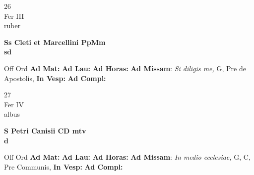 \documentclass[10pt, openany]{book}
\begin{document}
        \begin{center}
            \begin{minipage}{3.5in}
                \vspace{2em}
                \begin{minipage}{0.5in}
                    {\Huge 26} \\
                    {\normalsize Fer III} \\
                    {\normalsize ruber}
                \end{minipage}
                \begin{minipage}{3.0in}
                    \textbf{ \large Ss Cleti et Marcellini PpMm \\
                    \textnormal{\normalsize sd}} \\ 
                \end{minipage}
                \begin{justify}Off Ord
                    \textbf{Ad Mat: }
                    \textbf{Ad Lau: }
                    \textbf{Ad Horas: }\textbf{Ad Missam}: \textit{Si diligis me,} G, Pre de Apostolis,  
                    \textbf{In Vesp: }
                    \textbf{Ad Compl: }
                \end{justify}
            \end{minipage}
        \end{center}
    
        \begin{center}
            \begin{minipage}{3.5in}
                \vspace{2em}
                \begin{minipage}{0.5in}
                    {\Huge 27} \\
                    {\normalsize Fer IV} \\
                    {\normalsize albus}
                \end{minipage}
                \begin{minipage}{3.0in}
                    \textbf{ \large S Petri Canisii CD mtv \\
                    \textnormal{\normalsize d}} \\ 
                \end{minipage}
                \begin{justify}Off Ord
                    \textbf{Ad Mat: }
                    \textbf{Ad Lau: }
                    \textbf{Ad Horas: }\textbf{Ad Missam}: \textit{In medio ecclesiae,} G, C, Pre Communis,  
                    \textbf{In Vesp: }
                    \textbf{Ad Compl: }
                \end{justify}
            \end{minipage}
        \end{center}
    
\end{document}
